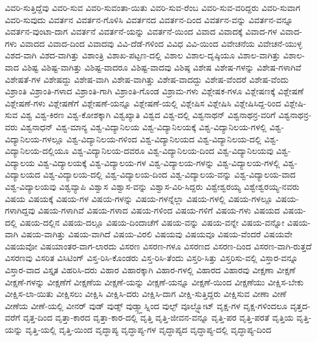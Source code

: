 {ವಿವರಿ-ಸುತ್ತಿದ್ದೆವು
ವಿವರಿ-ಸುವ
ವಿವರಿ-ಸುವಂತಾ-ಯಿತು
ವಿವರಿ-ಸುವ-ರೆಂಬ
ವಿವರಿ-ಸುವ-ವರಿದ್ದರು
ವಿವರಿ-ಸುವಾಗ
ವಿವರಿ-ಸುವುದು
ವಿವರ್ತನ
ವಿವರ್ತನ-ಗೊಳಿಸಿ
ವಿವರ್ತನದ
ವಿವರ್ತನ-ದಿಂದ
ವಿವರ್ತನ-ವನ್ನು
ವಿವರ್ತನ-ವನ್ನೂ
ವಿವರ್ತನ-ವುಂಟಾ-ದಾಗ
ವಿವರ್ತನೆ
ವಿವರ್ತನೆ-ಯನ್ನು
ವಿವರ್ತನೆ-ಯಿಂದ
ವಿವಾದ
ವಿವಾದಕ್ಕೆ
ವಿವಾದ-ಗಳ
ವಿವಾದ-ಗಳು
ವಿವಾದದ
ವಿವಾದ-ದಿಂದ
ವಿವಾದವು
ವಿವಿ-ದೆಡೆ-ಗಳಿಂದ
ವಿವಿಧ
ವಿವಿ-ಯಿಂದ
ವಿವೇಚನೆಯ
ವಿವೇಚನೆ-ಯುಳ್ಳ
ವಿಶದ-ವಾಗಿ
ವಿಶದ-ವಾಗಿತ್ತು
ವಿಶಾಂತ್ರಿ
ವಿಶಾಖ-ಪಟ್ಟಣ-ದಲ್ಲಿ
ವಿಶಾಲ
ವಿಶಾಲ-ದೃಷ್ಠಿಯೂ
ವಿಶಾಲ-ವಾಗಿತ್ತು
ವಿಶಾಲ-ವಾದ
ವಿಶಿಷ್ಟ
ವಿಶಿಷ್ಟ-ವಾಗಿತ್ತು
ವಿಶಿಷ್ಟ-ವಾದರೂ
ವಿಶಿಷ್ಟ-ವಾದವು
ವಿಶಿಷ್ಠ
ವಿಶೇಷ
ವಿಶೇಷ-ಗಳನ್ನು
ವಿಶೇಷ-ಗಳಾಗಿವೆ
ವಿಶೇಷತೆ-ಗಳ
ವಿಶೇಷದ್ದು
ವಿಶೇಷ-ವಾಗಿ
ವಿಶೇಷ-ವಾಗಿತ್ತು
ವಿಶೇಷ-ವಾದದ್ದು
ವಿಶೇಷ-ವೆಂದರೆ
ವಿಶೇಷ-ವೆಂದು
ವಿಶ್ರಾಂತಿ
ವಿಶ್ರಾಂತಿ-ಗಳಾದ
ವಿಶ್ರಾಂತಿ-ಗಾಗಿ
ವಿಶ್ರಾಂತಿ-ಗೊಂಡ
ವಿಶ್ರಾಮ-ಗಳು
ವಿಶ್ಲೇಷಕ-ಗಳೂ
ವಿಶ್ಲೇಷಣಕ್ಕೆ
ವಿಶ್ಲೇಷಣೆ
ವಿಶ್ಲೇಷಣೆ-ಗಳು
ವಿಶ್ಲೇಷಣೆಗೆ
ವಿಶ್ಲೇಷಣೆ-ಯನ್ನೂ
ವಿಶ್ಲೇಷಣೆ-ಯಲ್ಲಿ
ವಿಶ್ಲೇಷಿಸ
ವಿಶ್ಲೇಷಿಸಿ
ವಿಶ್ಲೇಷಿಸಿದ್ದ-ರಿಂದ
ವಿಶ್ಲೇಷಿ-ಸುವ
ವಿಶ್ವ
ವಿಶ್ವ-ಕಿರಣ
ವಿಶ್ವ-ಕೋಶಕ್ಕಾಗಿ
ವಿಶ್ವಖ್ಯಾತಿ
ವಿಶ್ವದ
ವಿಶ್ವ-ದಲ್ಲಿ
ವಿಶ್ವನಾಥನ್
ವಿಶ್ವನಾಥನ್ರ-ವರಿಗೆ
ವಿಶ್ವನಾಥನ್ರ-ವರು
ವಿಶ್ವನಾಧನ್
ವಿಶ್ವ-ಮಾನ್ಯ
ವಿಶ್ವ-ವಿದ್ಯಾನಿಲಯ
ವಿಶ್ವ-ವಿದ್ಯಾನಿಲಯಕ್ಕೆ
ವಿಶ್ವ-ವಿದ್ಯಾನಿಲಯ-ಗಳಲ್ಲಿ
ವಿಶ್ವ-ವಿದ್ಯಾನಿಲಯ-ಗಳಲ್ಲೂ
ವಿಶ್ವ-ವಿದ್ಯಾನಿಲಯ-ಗಳಿಂದ
ವಿಶ್ವ-ವಿದ್ಯಾನಿಲಯದ
ವಿಶ್ವ-ವಿದ್ಯಾನಿಲಯ-ದಲ್ಲಿ
ವಿಶ್ವ-ವಿದ್ಯಾನಿಲಯ-ದಲ್ಲಿಯೂ
ವಿಶ್ವ-ವಿದ್ಯಾನಿಲಯ-ದವರೂ
ವಿಶ್ವ-ವಿದ್ಯಾನಿಲಯ-ದಿಂದ
ವಿಶ್ವ-ವಿದ್ಯಾನಿಲಯವು
ವಿಶ್ವ-ವಿದ್ಯಾಲಯ
ವಿಶ್ವ-ವಿದ್ಯಾಲಯಕ್ಕೆ
ವಿಶ್ವ-ವಿದ್ಯಾಲಯ-ಗಳ
ವಿಶ್ವ-ವಿದ್ಯಾಲಯ-ಗಳನ್ನು
ವಿಶ್ವ-ವಿದ್ಯಾಲಯ-ಗಳಲ್ಲಿ
ವಿಶ್ವ-ವಿದ್ಯಾಲಯದ
ವಿಶ್ವ-ವಿದ್ಯಾಲಯ-ದಲ್ಲಿ
ವಿಶ್ವ-ವಿದ್ಯಾಲಯ-ದಿಂದ
ವಿಶ್ವ-ವಿದ್ಯಾಲಯ-ವನ್ನು
ವಿಶ್ವ-ವಿದ್ಯಾಲಯ-ವಾದ
ವಿಶ್ವ-ವಿದ್ಯಾಲಯವು
ವಿಶ್ವವ್ಯಾಪಿ
ವಿಶ್ವಾಸ
ವಿಶ್ವಾಸ-ವನ್ನು
ವಿಶ್ವಾಸ-ವಿರಿ-ಸಿದ್ದರು
ವಿಶ್ವೇಶ್ವರಯ್ಯ
ವಿಶ್ವೇಶ್ವರಯ್ಯ-ನವರು
ವಿಷಯ
ವಿಷಯಕ್ಕೆ
ವಿಷಯ-ಗಳ
ವಿಷಯ-ಗಳನ್ನು
ವಿಷಯ-ಗಳನ್ನೆಲ್ಲಾ
ವಿಷಯ-ಗಳಲ್ಲಿ
ವಿಷಯ-ಗಳಲ್ಲೂ
ವಿಷಯ-ಗಳಾಗಿದ್ದವು
ವಿಷಯ-ಗಳಾಗಿವೆ
ವಿಷಯ-ಗಳಾದ
ವಿಷಯ-ಗಳಿಂದ
ವಿಷಯ-ಗಳಿಗೆ
ವಿಷಯ-ಗಳು
ವಿಷಯದ
ವಿಷಯ-ದಲ್ಲಿ
ವಿಷಯ-ದಲ್ಲಿನ
ವಿಷಯ-ದಲ್ಲೂ
ವಿಷಯ-ದಿಂದಾಚೆಗೆ
ವಿಷಯ-ವನ್ನು
ವಿಷಯ-ವನ್ನೇ
ವಿಷಯ-ವನ್ನೋ
ವಿಷಯ-ವಾಗಿ
ವಿಷಯ-ವಾಗಿತ್ತು
ವಿಷಯ-ವಾಗಿದೆ
ವಿಷಯ-ವಿರಲಿ
ವಿಷಯವು
ವಿಷಯವೂ
ವಿಷಯ-ವೆಂದರೆ
ವಿಷಯವೇ
ವಿಷಯವೋ
ವಿಷಯಾಂತರ-ವಾಗ-ಲಾರದು
ವಿಸರಣ
ವಿಸರಣ-ಗಳೂ
ವಿಸರಣದ
ವಿಸರಣ-ದಿಂದ
ವಿಸರಣ-ವಾಗಿ-ರುತ್ತದೆ
ವಿಸರಣವು
ವಿಸರಿತ
ವಿಸಿಟಿಂಗ್
ವಿಸ್ತ-ರಿಸಿ-ಕೊಂಡರು
ವಿಸ್ತ-ರಿಸಿ-ತೆಂದು
ವಿಸ್ತರಿ-ಸಿತ್ತು
ವಿಸ್ತರಿಸು-ವಲ್ಲಿ
ವಿಸ್ತಾರ-ವನ್ನೂ
ವಿಸ್ತಾರ-ವಾದ
ವಿಸ್ತೃತ
ವಿಹರಿಸಿ-ದರು
ವಿಹಾರ
ವಿಹಾರಕ್ಕಾಗಿ
ವಿಹಾರ-ಗಳಲ್ಲಿ
ವಿಹಾರದ
ವಿಹಾರವು
ವೀಕ್ಷಣಾ
ವೀಕ್ಷಣೆ
ವೀಕ್ಷಣೆ-ಗಳನ್ನು
ವೀಕ್ಷಣೆಗೆ
ವೀಕ್ಷಣೆಯ
ವೀಕ್ಷಣೆ-ಯನ್ನು
ವೀಕ್ಷಣೆ-ಯನ್ನೂ
ವೀಕ್ಷಣೆ-ಯಿಂದ
ವೀಕ್ಷಣೆಯು
ವೀಕ್ಷಿಸ-ಬೇಕು
ವೀಕ್ಷಿಸ-ಲಾ-ಯಿತು
ವೀಕ್ಷಿಸಲು
ವೀಕ್ಷಿಸಿ
ವೀಕ್ಷಿಸಿ-ದರು
ವೀಕ್ಷಿಸಿ-ದಾಗ
ವೀಕ್ಷಿ-ಸುತ್ತಿದ್ದರು
ವೀಕ್ಷಿಸುವ
ವೀಣಾ
ವೀಣೆ
ವೀಣೆಯ
ವೀಣೆ-ಯಲ್ಲಿ
ವೀನರ್
ವುಡ್
ವುಡ್ಸ್
ವುಡ್ಸ್ಗ್ಲಾಸ್ನಿಂದ
ವುಲ್ಫ್
ವೂಲ್ಫ್ನೋಟ್
ವೃಕ್ಷ-ಗಳ
ವೃಕ್ಷ-ಗಳಿಂದಲೂ
ವೃತ್ತದ-ವರೆಗೆ
ವೃತ್ತ-ದಿಂದ
ವೃತ್ತಾ-ಕಾರದ
ವೃತ್ತಾ-ಕಾರ-ದಲ್ಲಿ
ವೃತ್ತಿ
ವೃತ್ತಿ-ಜೀವನ-ವನ್ನೂ
ವೃತ್ತಿ-ಪರ
ವೃತ್ತಿ-ಪರತೆ
ವೃತ್ತಿಯ
ವೃತ್ತಿ-ಯನ್ನು
ವೃತ್ತಿ-ಯಲ್ಲಿ
ವೃತ್ತಿ-ಯಿಂದ
ವೃದ್ಧಾಪ್ಯ
ವೃದ್ಧಾಪ್ಯ-ಗಳ
ವೃದ್ಧಾಪ್ಯದ
ವೃದ್ಧಾಪ್ಯ-ದಲ್ಲಿ
ವೃದ್ಧಾಪ್ಯ-ದಿಂದ
}

